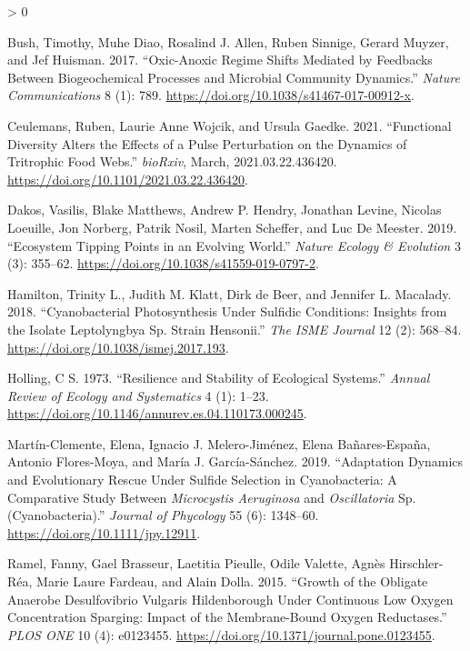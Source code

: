 \documentclass{article}
\newlength{\cslhangindent}
\newenvironment{CSLReferences}[2] %
 {%
  \setlength{\parindent}{0pt}
  \ifodd #1 \everypar{\setlength{\hangindent}{\cslhangindent}}\ignorespaces\fi
  \ifnum #2 > 0
  \setlength{\parskip}{#2\baselineskip}
  \fi
 }%
 {}
\begin{document}
\hypertarget{refs}{}
\begin{CSLReferences}{1}{0}
\leavevmode\hypertarget{ref-bush2017}{}%
Bush, Timothy, Muhe Diao, Rosalind J. Allen, Ruben Sinnige, Gerard
Muyzer, and Jef Huisman. 2017. {``Oxic-Anoxic Regime Shifts Mediated by
Feedbacks Between Biogeochemical Processes and Microbial Community
Dynamics.''} \emph{Nature Communications} 8 (1): 789.
\url{https://doi.org/10.1038/s41467-017-00912-x}.

\leavevmode\hypertarget{ref-ceulemans2021}{}%
Ceulemans, Ruben, Laurie Anne Wojcik, and Ursula Gaedke. 2021.
{``Functional Diversity Alters the Effects of a Pulse Perturbation on
the Dynamics of Tritrophic Food Webs.''} \emph{bioRxiv}, March,
2021.03.22.436420. \url{https://doi.org/10.1101/2021.03.22.436420}.

\leavevmode\hypertarget{ref-dakos2019b}{}%
Dakos, Vasilis, Blake Matthews, Andrew P. Hendry, Jonathan Levine,
Nicolas Loeuille, Jon Norberg, Patrik Nosil, Marten Scheffer, and Luc De
Meester. 2019. {``Ecosystem Tipping Points in an Evolving World.''}
\emph{Nature Ecology \& Evolution} 3 (3): 355--62.
\url{https://doi.org/10.1038/s41559-019-0797-2}.

\leavevmode\hypertarget{ref-hamilton2018}{}%
Hamilton, Trinity L., Judith M. Klatt, Dirk de Beer, and Jennifer L.
Macalady. 2018. {``Cyanobacterial Photosynthesis Under Sulfidic
Conditions: Insights from the Isolate Leptolyngbya Sp. Strain
Hensonii.''} \emph{The ISME Journal} 12 (2): 568--84.
\url{https://doi.org/10.1038/ismej.2017.193}.

\leavevmode\hypertarget{ref-holling1973}{}%
Holling, C S. 1973. {``Resilience and Stability of Ecological
Systems.''} \emph{Annual Review of Ecology and Systematics} 4 (1):
1--23. \url{https://doi.org/10.1146/annurev.es.04.110173.000245}.

\leavevmode\hypertarget{ref-martuxednclemente2019}{}%
Martín-Clemente, Elena, Ignacio J. Melero-Jiménez, Elena Bañares-España,
Antonio Flores-Moya, and María J. García-Sánchez. 2019. {``Adaptation
Dynamics and Evolutionary Rescue Under Sulfide Selection in
Cyanobacteria: A Comparative Study Between {\emph{Microcystis
Aeruginosa}} and {\emph{Oscillatoria}} Sp. (Cyanobacteria).''}
\emph{Journal of Phycology} 55 (6): 1348--60.
\url{https://doi.org/10.1111/jpy.12911}.

\leavevmode\hypertarget{ref-ramel2015}{}%
Ramel, Fanny, Gael Brasseur, Laetitia Pieulle, Odile Valette, Agnès
Hirschler-Réa, Marie Laure Fardeau, and Alain Dolla. 2015. {``Growth of
the Obligate Anaerobe Desulfovibrio Vulgaris Hildenborough Under
Continuous Low Oxygen Concentration Sparging: Impact of the
Membrane-Bound Oxygen Reductases.''} \emph{PLOS ONE} 10 (4): e0123455.
\url{https://doi.org/10.1371/journal.pone.0123455}.


\end{CSLReferences}
\end{document}
